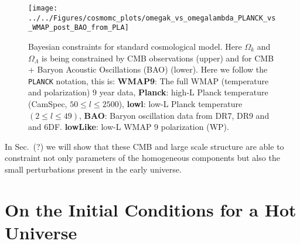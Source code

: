 \documentclass[12pt,letterpaper,twoside]{book}
\begin{document}
\begin{figure}[tb]
    \begin{center}
        \texttt{[image: ../../Figures/cosmomc\_plots/omegak\_vs\_omegalambda\_PLANCK\_vs\_WMAP\_post\_BAO\_from\_PLA]}
        \caption{Bayesian constraints for standard cosmological model. Here $\Omega_k$
            and $\Omega_\Lambda$ is being constrained by CMB observations (upper) and
            for CMB + Baryon Acoustic Oscillations (BAO) (lower). Here we follow the
            \texttt{PLANCK} notation, this is: \textbf{WMAP9}: The full WMAP
            (temperature and polarization) 9 year data, \textbf{Planck}: high-L Planck
            temperature (CamSpec, $50 \leq l \leq 2500$), \textbf{lowl}: low-L Planck
            temperature $(2 \leq l \leq 49)$, \textbf{BAO}:	Baryon oscillation data from
            DR7, DR9 and and 6DF.  \textbf{lowLike}:	low-L WMAP 9 polarization (WP).
        }
        \label{fig:concordance_model_flat}
    \end{center}
\end{figure}

In Sec.~(?) we will show that these CMB and large scale structure are able to
constraint not only parameters of the homogeneous components but also the
small perturbations present in the early universe.


\section{On the Initial Conditions for a Hot Universe }
\label{sec:initial_conditions}
\end{document}

